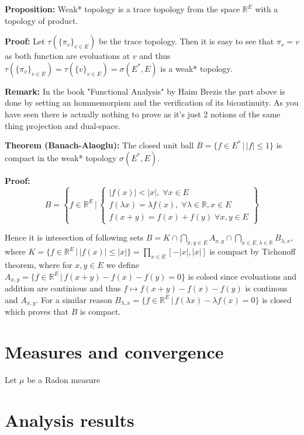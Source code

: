 \documentclass{article}
\begin{document}
\vspace{1ex}
\textbf{Proposition:} Weak* topology is a trace topology from the space
$\mathbb{R}^E$ with a topology of product.

\vspace{1ex}
\textbf{Proof:} Let $\tau(\{\pi_v\}_{v\in E})$ be the trace topology. Then it
is easy to see that $\pi_v=v$ as both function are evoluations at $v$ and thus
$\tau(\{\pi_v\}_{v\in E})=\tau(\{v\}_{v\in E})=\sigma(E^*, E)$ is a weak*
topology.

\vspace{1ex}
\textbf{Remark:} In the book "Functional Analysis" by Haim Brezis the part
above is done by setting an hommemorpism and the verification of its bicontinuity.
As you have seen there is actually nothing to prove as it's just 2 notions of
the same thing projection and dual-space.

\vspace{1ex}
\textbf{Theorem (Banach-Alaoglu):} The closed unit ball $B=\{f\in E^*\,|\,|
f|\leq 1\}$ is compact in the weak* topology $\sigma(E^*, E)$.

\vspace{1ex}
\textbf{Proof:}
\[ B=\left\{f\in\mathbb{R}^E\,|\,
\begin{cases}
    |f(x)|<|x|,\;\forall x\in E\\
    f(\lambda x)=\lambda f(x),\;\forall\lambda\in\mathbb{R}, x\in E\\
    f(x+y)=f(x)+f(y)\;\forall x,y\in E
\end{cases}
\right\} \] 

Hence it is intesection of following sets $B=K\cap\bigcap_{x,y\in E} A_{x,y}
\cap\bigcap_{x\in E, \lambda\in\mathbb{R}}B_{\lambda,x}$, where $K=\{f\in\mathbb
{R}^E\,|\,|f(x)|\leq|x|\}=\prod_{x\in E}[-|x|, |x|]$ is compact by Tichonoff
theorem, where for $x,y\in E$ we define $A_{x,y}=\{f\in\mathbb{R}^E\,|\,f(x+y)-
f(x)-f(y)=0\}$ is colsed since evoluations and addition are continious and
thus $f\mapsto f(x+y)-f(x)-f(y)$ is continous and $A_{x,y}$. For a similar
reason $B_{\lambda, x}=\{f\in\mathbb{R}^E\,|\,f(\lambda x)-\lambda f(x)=0\}$ is
closed which proves that $B$ is compact.


\section{Measures and convergence}

Let $\mu$ be a Radon measure

\section{Analysis results}
\end{document}
